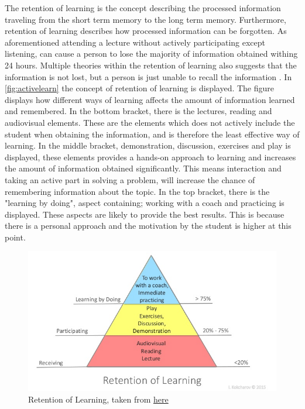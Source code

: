 The retention of learning is the concept describing the processed information traveling from the short term memory to the long term memory. Furthermore, retention of learning describes how processed information can be forgotten. As aforementioned attending a lecture without actively participating except listening, can cause a person to lose the majority of information obtained withing 24 hours. Multiple theories within the retention of learning also suggests that the information is not lost, but a person is just unable to recall the information \cite{retention}.
In \autoref{fig:activelearn} the concept of retention of learning is displayed. The figure displays how different ways of learning affects the amount of information learned and remembered. In the bottom bracket, there is the lectures, reading and audiovisual elements. These are the elements which does not actively include the student when obtaining the information, and is therefore the least effective way of learning. In the middle bracket, demonstration, discussion, exercises and play is displayed, these elements provides a hands-on approach to learning and increases the amount of information obtained significantly. This means interaction and taking an active part in solving a problem, will increase the chance of remembering information about the topic. In the top bracket, there is the "learning by doing", aspect containing; working with a coach and practicing is displayed. These aspects are likely to provide the best results. This is because there is a personal approach and the motivation by the student is higher at this point\cite{retention}. 

\begin{figure}[H]
	\centering
	\includegraphics[width=0.9\linewidth]{figure/Analysis/skillslearn}
	\caption{Retention of Learning, taken from  \href{https://www.slideshare.net/igorkokcharov/kokcharov-skillpyramid2015}{\color{blue}here}}
	\label{fig:activelearn}
\end{figure}

